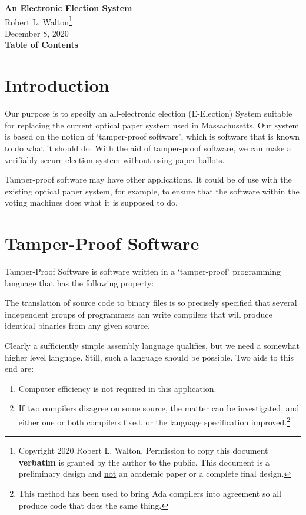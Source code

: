 \documentclass[12pt]{article}
\makeatletter
\renewcommand\tableofcontents{%
    \begin{list}{}%
	     {\setlength{\itemsep}{0in}%
	      \setlength{\topsep}{0in}%
	      \setlength{\parsep}{1ex}%
	      \setlength{\labelwidth}{0in}%
	      \setlength{\baselineskip}{1.5ex}%
	      \setlength{\leftmargin}{0.8in}%
	      \setlength{\rightmargin}{0.8in}}%
    \item\@starttoc{toc}%
    \end{list}}
\newenvironment{indpar}[1][0.3in]%
	{\begin{list}{}%
		     {\setlength{\itemsep}{0in}%
		      \setlength{\topsep}{0in}%
		      \setlength{\parsep}{1ex}%
		      \setlength{\labelwidth}{#1}%
		      \setlength{\leftmargin}{#1}%
		      \addtolength{\leftmargin}{\labelsep}}%
	 \item}%
	{\end{list}}
\makeatother
\begin{document}
        
\begin{center}
\Large
{\LARGE  \bf An Electronic Election System}
\\[2ex]
Robert L. Walton\footnote{Copyright 2020 Robert L. Walton.
Permission to copy this document {\bf verbatim} is granted by the author
to the public. This document is a preliminary design and
\underline{not} an academic paper or a complete final
design.}
\\[2ex]
December 8, 2020
\\[2ex]
{\bf Table of Contents}
\end{center}

\bigskip

\tableofcontents 

\newpage

\section{Introduction}

Our purpose is to specify an all-electronic election (E-Election) System
suitable for replacing the current optical paper system
used in Massachusetts.  Our system is based on the notion
of `tamper-proof software', which is software that is
known to do what it should do.  With the aid of tamper-proof
software, we can make a verifiably secure election system without
using paper ballots.

Tamper-proof software may have other applications.
It could be of use with the existing optical paper system,
for example, to ensure that the software within the voting
machines does what it is supposed to do.

\section{Tamper-Proof Software}

Tamper-Proof Software is software written in a `tamper-proof'
programming language
that has the following property:
\begin{indpar}
The translation of source code to binary files is so precisely
specified that several independent groups of programmers can
write compilers that will produce identical binaries from any
given source.
\end{indpar}

Clearly a sufficiently simple assembly language qualifies, but
we need a somewhat higher level language.  Still, such a language
should be possible.  Two aids to this end are:
\begin{enumerate}
\item
Computer efficiency is not required in this application.

\item
If two compilers disagree on some source, the matter can be
investigated, and either one or both compilers fixed, or the
language specification improved.\footnote{This method has been
used to bring Ada compilers into agreement so all produce
code that does the same thing.}
\end{enumerate}
\end{document}
